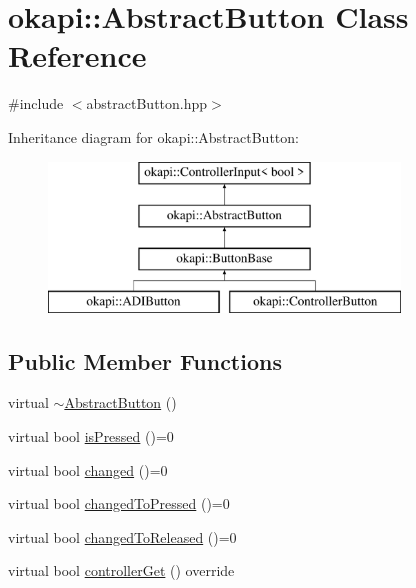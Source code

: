 \hypertarget{classokapi_1_1AbstractButton}{}\section{okapi\+::Abstract\+Button Class Reference}
\label{classokapi_1_1AbstractButton}


{\ttfamily \#include $<$abstract\+Button.\+hpp$>$}

Inheritance diagram for okapi\+::Abstract\+Button\+:\begin{figure}[H]
\begin{center}
\leavevmode
\includegraphics[height=4.000000cm]{classokapi_1_1AbstractButton}
\end{center}
\end{figure}
\subsection*{Public Member Functions}
\begin{DoxyCompactItemize}
\item 
virtual \mbox{\hyperlink{classokapi_1_1AbstractButton_a3b05b71f4e527d173e1ae5bfd582fb61}{$\sim$\+Abstract\+Button}} ()
\item 
virtual bool \mbox{\hyperlink{classokapi_1_1AbstractButton_aea582f04f6ec3f5714b285421d2db66e}{is\+Pressed}} ()=0
\item 
virtual bool \mbox{\hyperlink{classokapi_1_1AbstractButton_a72dd56f1e084b3313a2a407aa35dc7dc}{changed}} ()=0
\item 
virtual bool \mbox{\hyperlink{classokapi_1_1AbstractButton_a762fbcfb5065497d743a6a43fd2032f3}{changed\+To\+Pressed}} ()=0
\item 
virtual bool \mbox{\hyperlink{classokapi_1_1AbstractButton_ab4f7a216d6d0a9d14bb89705df0327b3}{changed\+To\+Released}} ()=0
\item 
virtual bool \mbox{\hyperlink{classokapi_1_1AbstractButton_a4b8574ff797eb44fcd84d6831dc8a8a0}{controller\+Get}} () override
\end{DoxyCompactItemize}


